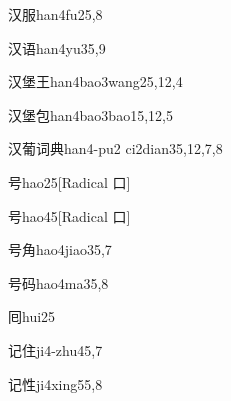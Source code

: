 \begin{verbete}{汉服}{han4fu2}{5,8}
\end{verbete}

\begin{verbete}{汉语}{han4yu3}{5,9}
\end{verbete}

\begin{verbete}{汉堡王}{han4bao3wang2}{5,12,4}
\end{verbete}

\begin{verbete}{汉堡包}{han4bao3bao1}{5,12,5}
\end{verbete}

\begin{verbete}{汉葡词典}{han4-pu2 ci2dian3}{5,12,7,8}
\end{verbete}

\begin{verbete}{号}{hao2}{5}[Radical 口]
\end{verbete}

\begin{verbete}{号}{hao4}{5}[Radical 口]
\end{verbete}

\begin{verbete}{号角}{hao4jiao3}{5,7}
\end{verbete}

\begin{verbete}{号码}{hao4ma3}{5,8}
\end{verbete}

\begin{verbete}{囘}{hui2}{5}
\end{verbete}

\begin{verbete}{记住}{ji4-zhu4}{5,7}
\end{verbete}

\begin{verbete}{记性}{ji4xing5}{5,8}
\end{verbete}

